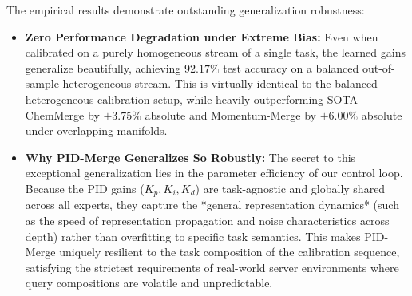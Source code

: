 \begin{table}[h]
\caption{Robustness and out-of-sample generalization of calibrated PID-Merge gains optimized under biased calibration stream compositions (evaluated on a balanced $200$-sample heterogeneous stream within the Isolating Coordinate Sandbox).}
\label{tab:calibration_generalization}
\vskip 0.15in
\begin{center}
\begin{small}
\begin{sc}
\end{sc}
\end{small}
\end{center}
\vskip -0.1in
\end{table}

The empirical results demonstrate outstanding generalization robustness:
\begin{itemize}
    \item \textbf{Zero Performance Degradation under Extreme Bias:} Even when calibrated on a purely homogeneous stream of a single task, the learned gains generalize beautifully, achieving $92.17\%$ test accuracy on a balanced out-of-sample heterogeneous stream. This is virtually identical to the balanced heterogeneous calibration setup, while heavily outperforming SOTA ChemMerge by $+3.75\%$ absolute and Momentum-Merge by $+6.00\%$ absolute under overlapping manifolds.
    \item \textbf{Why PID-Merge Generalizes So Robustly:} The secret to this exceptional generalization lies in the parameter efficiency of our control loop. Because the PID gains ($K_p, K_i, K_d$) are task-agnostic and globally shared across all experts, they capture the *general representation dynamics* (such as the speed of representation propagation and noise characteristics across depth) rather than overfitting to specific task semantics. This makes PID-Merge uniquely resilient to the task composition of the calibration sequence, satisfying the strictest requirements of real-world server environments where query compositions are volatile and unpredictable.
\end{itemize}

